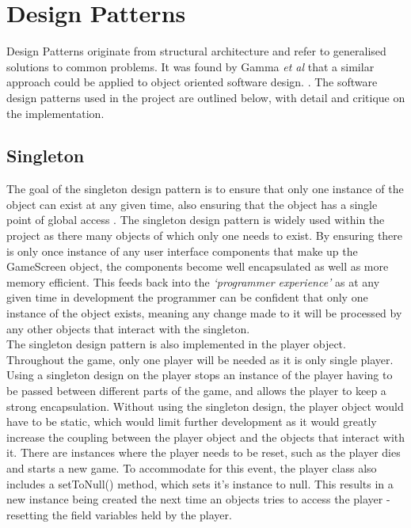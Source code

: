 \documentclass[a4paper,12pt]{article}
\begin{document}
\section*{Design Patterns}
Design Patterns originate from structural architecture and refer to generalised solutions to common problems. It was found by Gamma \textit{et al} that a similar approach could be applied to object oriented software design. \cite{GoF-Book}. The software design patterns used in the project are outlined below, with detail and critique on the implementation.

\subsection*{Singleton}
The goal of the singleton design pattern is to ensure that only one instance of the object can exist at any given time, also ensuring that the object has a single point of global access \cite{GoF-Book}. The singleton design pattern is widely used within the project as there many objects of which only one needs to exist. By ensuring there is only once instance of any user interface components that make up the GameScreen object, the components become well encapsulated as well as more memory efficient. This feeds back into the \textit{`programmer experience'} as at any given time in development the programmer can be confident that only one instance of the object exists, meaning any change made to it will be processed by any other objects that interact with the singleton. 
\\
The singleton design pattern is also implemented in the player object. Throughout the game, only one player will be needed as it is only single player. Using a singleton design on the player stops an instance of the player having to be passed between different parts of the game, and allows the player to keep a strong encapsulation. Without using the singleton design, the player object would have to be static, which would limit further development as it would greatly increase the coupling between the player object and the objects that interact with it. There are instances where the player needs to be reset, such as the player dies and starts a new game. To accommodate for this event, the player class also includes a setToNull() method, which sets it's instance to null. This results in a new instance being created the next time an objects tries to access the player - resetting the field variables held by the player. 
\end{document}
